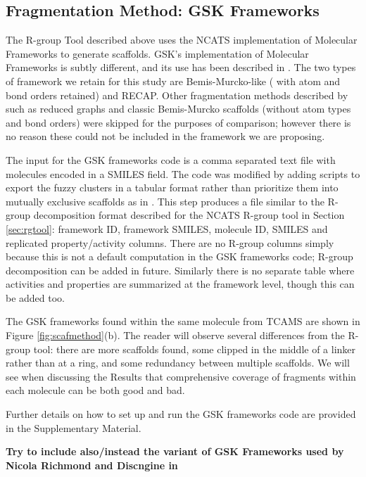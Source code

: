\documentclass[journal=jacsat,manuscript=article]{achemso}
\newcommand*\fref[1]{Figure \ref{fig:#1}}
\newcommand*\sref[1]{Section \ref{sec:#1}}
\begin{document}
\subsection{Fragmentation Method: GSK Frameworks}
\label{sec:gskframe}
The R-group Tool described above uses the NCATS implementation of Molecular Frameworks to generate scaffolds. GSK's implementation of Molecular Frameworks is subtly different, and its use has been described in \cite{Harper2004DDclus}. The two types of framework we retain for this study are Bemis-Murcko-like (\cite{BemisMurcko1996} with atom and bond orders retained) and RECAP\cite{Lewell:1998aa}. Other fragmentation methods described by \citeauthor{Harper2004DDclus} such as reduced graphs and classic Bemis-Murcko scaffolds (without atom types and bond orders) were skipped for the purposes of comparison; however there is no reason these could not be included in the framework we are proposing.    

The input for the GSK frameworks code is a comma separated text file with molecules encoded in a SMILES field.  The code was modified by adding scripts to export the fuzzy clusters in a tabular format rather than prioritize them into mutually exclusive scaffolds as in \citeauthor{Harper2004DDclus}. This step produces a file similar to the R-group decomposition format described for the NCATS R-group tool in \sref{rgtool}: framework ID, framework SMILES, molecule ID, SMILES and replicated property/activity columns.  There are no R-group columns simply because this is not a default computation in the GSK frameworks code; R-group decomposition can be added in future. Similarly there is no separate table where activities and properties are summarized at the framework level, though this can be added too.

The GSK frameworks found within the same molecule from TCAMS are shown in \fref{scafmethod}(b).  The reader will observe several differences from the R-group tool: there are more scaffolds found, some clipped in the middle of a linker rather than at a ring, and some redundancy between multiple scaffolds. We will see when discussing the Results that comprehensive coverage of fragments within each molecule can be both good and bad.   

Further details on how to set up and run the GSK frameworks code are provided in the Supplementary Material. 

\textbf{Try to include also/instead the variant of GSK Frameworks used by Nicola Richmond and Discngine in \cite{Richmond2015Galois}}
\end{document}

